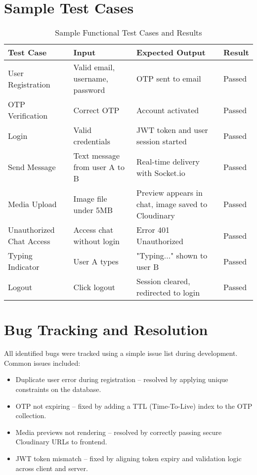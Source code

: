 \documentclass[12pt,a4paper]{report}
\begin{document}
\section{Sample Test Cases}

\begin{table}[H]
\centering
\begin{tabular}{|p{4cm}|p{3cm}|p{4cm}|p{2cm}|}
\hline
\textbf{Test Case} & \textbf{Input} & \textbf{Expected Output} & \textbf{Result} \\
\hline
User Registration & Valid email, username, password & OTP sent to email & Passed \\
\hline
OTP Verification & Correct OTP & Account activated & Passed \\
\hline
Login & Valid credentials & JWT token and user session started & Passed \\
\hline
Send Message & Text message from user A to B & Real-time delivery with Socket.io & Passed \\
\hline
Media Upload & Image file under 5MB & Preview appears in chat, image saved to Cloudinary & Passed \\
\hline
Unauthorized Chat Access & Access chat without login & Error 401 Unauthorized & Passed \\
\hline
Typing Indicator & User A types & "Typing..." shown to user B & Passed \\
\hline
Logout & Click logout & Session cleared, redirected to login & Passed \\
\hline
\end{tabular}
\caption{Sample Functional Test Cases and Results}
\end{table}

\section{Bug Tracking and Resolution}

All identified bugs were tracked using a simple issue list during development. Common issues included:

\begin{itemize}
    \item Duplicate user error during registration – resolved by applying unique constraints on the database.
    \item OTP not expiring – fixed by adding a TTL (Time-To-Live) index to the OTP collection.
    \item Media previews not rendering – resolved by correctly passing secure Cloudinary URLs to frontend.
    \item JWT token mismatch – fixed by aligning token expiry and validation logic across client and server.
\end{itemize}
\end{document}
